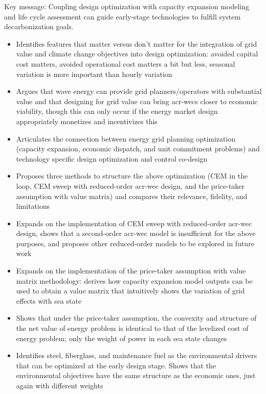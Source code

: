  Key message: Coupling design optimization with capacity expansion modeling and life cycle assessment can guide early-stage technologies to fulfill system decarbonization goals.
  \begin{itemize}
  \item Identifies features that matter versus don't matter for the integration of grid value and climate change objectives into design optimization: avoided capital cost matters, avoided operational cost matters a bit but less, seasonal variation is more important than hourly variation

  \item Argues that wave energy can provide grid planners/operators with substantial value and that designing for grid value can bring \glspl{acr-wec} closer to economic viability, though this can only occur if the energy market design appropriately monetizes and incentivizes this

  \item Articulates the connection between energy grid planning optimization (capacity expansion, economic dispatch, and unit commitment problems) and technology specific design optimization and control co-design

  \item Proposes three methods to structure the above optimization (CEM in the loop, CEM sweep with reduced-order \gls{acr-wec} design, and the price-taker assumption with value matrix) and compares their relevance, fidelity, and limitations

  \item Expands on the implementation of CEM sweep with reduced-order \gls{acr-wec} design, shows that a second-order \gls{acr-wec} model is insufficient for the above purposes, and proposes other reduced-order models to be explored in future work

  \item Expands on the implementation of the price-taker assumption with value matrix methodology: derives how capacity expansion model outputs can be used to obtain a value matrix that intuitively shows the variation of grid effects with sea state

  \item Shows that under the price-taker assumption, the convexity and structure of the net value of energy problem is identical to that of the levelized cost of energy problem; only the weight of power in each sea state changes

  \item Identifies steel, fiberglass, and maintenance fuel as the environmental drivers that can be optimized at the early design stage.
  Shows that the environmental objectives have the same structure as the economic ones, just again with different weights

  \end{itemize}
\fi

